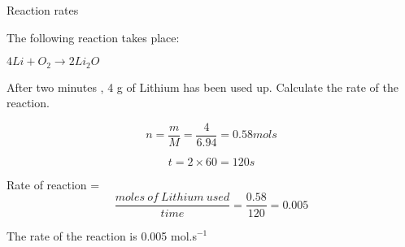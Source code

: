\begin{wex}{Reaction rates}{The following reaction takes place: 
\begin{center}
\rm${4Li + O_{2} \rightarrow 2Li_{2}O}$
\end{center}

After two minutes , 4 g of Lithium has been used up. Calculate the rate of the reaction.\\
}

{

\begin{equation*}
n = \frac{m}{M} = \frac{4}{6.94} = 0.58 mols 
\end{equation*}

\begin{equation*}
t = 2 \times 60 = 120 s
\end{equation*}

Rate of reaction = \begin{equation*} \frac{moles \ of \ Lithium \ used}{time} = \frac{0.58}{120} = 0.005\end{equation*} 

The rate of the reaction is 0.005 mol.s$^{-1}$
}\end{wex}

